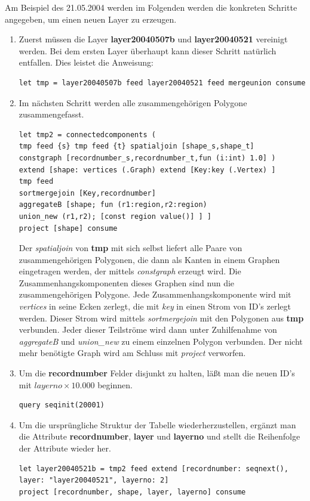 Am Beispiel des 21.05.2004 werden im Folgenden werden die konkreten Schritte angegeben, um einen neuen Layer zu erzeugen.
\begin{enumerate}
\item  Zuerst müssen die Layer \textbf{layer20040507b} und \textbf{layer20040521} vereinigt werden. Bei dem ersten Layer überhaupt kann dieser Schritt natürlich entfallen. Dies leistet die Anweisung: 

\begin{verbatim}
let tmp = layer20040507b feed layer20040521 feed mergeunion consume
\end{verbatim}
\item Im nächsten Schritt werden alle zusammengehörigen Polygone zusammengefasst.

\begin{verbatim}
let tmp2 = connectedcomponents (
tmp feed {s} tmp feed {t} spatialjoin [shape_s,shape_t] 
constgraph [recordnumber_s,recordnumber_t,fun (i:int) 1.0] ) 
extend [shape: vertices (.Graph) extend [Key:key (.Vertex) ] 
tmp feed 
sortmergejoin [Key,recordnumber] 
aggregateB [shape; fun (r1:region,r2:region) 
union_new (r1,r2); [const region value()] ] ] 
project [shape] consume
\end{verbatim}
Der \textit{spatialjoin} von \textbf{tmp} mit sich selbst liefert alle Paare von zusammengehörigen Polygonen, die dann als Kanten in einem Graphen eingetragen werden, der mittels \textit{constgraph} erzeugt wird. Die Zusammenhangskomponenten dieses Graphen sind nun die zusammengehörigen Polygone. Jede Zusammenhangskomponente wird mit \textit{vertices} in seine Ecken zerlegt, die mit \textit{key} in einen Strom von ID's zerlegt werden. Dieser Strom wird mittels \textit{sortmergejoin} mit den Polygonen aus \textbf{tmp} verbunden. Jeder dieser Teilströme wird dann unter Zuhilfenahme von \textit{aggregateB} und \textit{union\_new} zu einem einzelnen Polygon verbunden. Der nicht mehr benötigte Graph wird am Schluss mit \textit{project} verworfen.

\item Um die \textbf{recordnumber} Felder disjunkt zu halten, läßt man die neuen ID's mit $layerno\times 10.000$ beginnen.

\begin{verbatim}
query seqinit(20001)
\end{verbatim}
\item Um die ursprüngliche Struktur der Tabelle wiederherzustellen, ergänzt man die Attribute \textbf{recordnumber}, \textbf{layer} und \textbf{layerno} und stellt die Reihenfolge der Attribute wieder her.

\begin{verbatim}
let layer20040521b = tmp2 feed extend [recordnumber: seqnext(),
layer: "layer20040521", layerno: 2] 
project [recordnumber, shape, layer, layerno] consume
\end{verbatim}
\end{enumerate}


